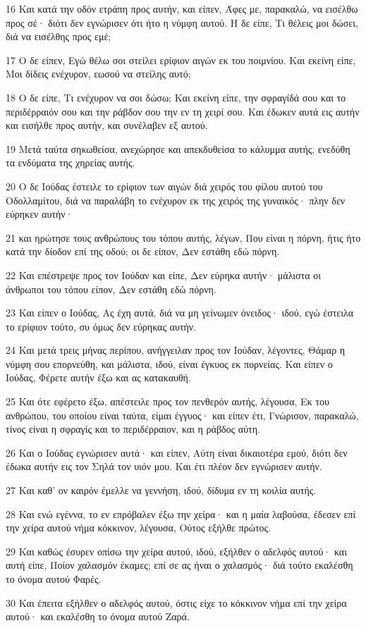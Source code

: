 \par 16 Και κατά την οδόν ετράπη προς αυτήν, και είπεν, Άφες με, παρακαλώ, να εισέλθω προς σέ· διότι δεν εγνώρισεν ότι ήτο η νύμφη αυτού. Η δε είπε, Τι θέλεις μοι δώσει, διά να εισέλθης προς εμέ;
\par 17 Ο δε είπεν, Εγώ θέλω σοι στείλει ερίφιον αιγών εκ του ποιμνίου. Και εκείνη είπε, Μοι δίδεις ενέχυρον, εωσού να στείλης αυτό;
\par 18 Ο δε είπε, Τι ενέχυρον να σοι δώσω; Και εκείνη είπε, την σφραγίδά σου και το περιδέρραιόν σου και την ράβδον σου την εν τη χειρί σου. Και έδωκεν αυτά εις αυτήν και εισήλθε προς αυτήν, και συνέλαβεν εξ αυτού.
\par 19 Μετά ταύτα σηκωθείσα, ανεχώρησε και απεκδυθείσα το κάλυμμα αυτής, ενεδύθη τα ενδύματα της χηρείας αυτής.
\par 20 Ο δε Ιούδας έστειλε το ερίφιον των αιγών διά χειρός του φίλου αυτού του Οδολλαμίτου, διά να παραλάβη το ενέχυρον εκ της χειρός της γυναικός· πλην δεν εύρηκεν αυτήν·
\par 21 και ηρώτησε τους ανθρώπους του τόπου αυτής, λέγων, Που είναι η πόρνη, ήτις ήτο κατά την δίοδον επί της οδού; οι δε είπον, Δεν εστάθη εδώ πόρνη.
\par 22 Και επέστρεψε προς τον Ιούδαν και είπε, Δεν εύρηκα αυτήν· μάλιστα οι άνθρωποι του τόπου είπον, Δεν εστάθη εδώ πόρνη.
\par 23 Και είπεν ο Ιούδας, Ας έχη αυτά, διά να μη γείνωμεν όνειδος· ιδού, εγώ έστειλα το ερίφιον τούτο, συ όμως δεν εύρηκας αυτήν.
\par 24 Και μετά τρεις μήνας περίπου, ανήγγειλαν προς τον Ιούδαν, λέγοντες, Θάμαρ η νύμφη σου επορνεύθη, και μάλιστα, ιδού, είναι έγκυος εκ πορνείας. Και είπεν ο Ιούδας, Φέρετε αυτήν έξω και ας κατακαυθή.
\par 25 Και ότε εφέρετο έξω, απέστειλε προς τον πενθερόν αυτής, λέγουσα, Εκ του ανθρώπου, του οποίου είναι ταύτα, είμαι έγγυος· και είπεν έτι, Γνώρισον, παρακαλώ, τίνος είναι η σφραγίς και το περιδέρραιον, και η ράβδος αύτη.
\par 26 Και ο Ιούδας εγνώρισεν αυτά· και είπεν, Αύτη είναι δικαιοτέρα εμού, διότι δεν έδωκα αυτήν εις τον Σηλά τον υιόν μου. Και έτι πλέον δεν εγνώρισεν αυτήν.
\par 27 Και καθ' ον καιρόν έμελλε να γεννήση, ιδού, δίδυμα εν τη κοιλία αυτής.
\par 28 Και ενώ εγέννα, το εν επρόβαλεν έξω την χείρα· και η μαία λαβούσα, έδεσεν επί την χείρα αυτού νήμα κόκκινον, λέγουσα, Ούτος εξήλθε πρώτος.
\par 29 Και καθώς έσυρεν οπίσω την χείρα αυτού, ιδού, εξήλθεν ο αδελφός αυτού· και αυτή είπε, Ποίον χαλασμόν έκαμες; επί σε ας ήναι ο χαλασμός· διά τούτο εκαλέσθη το όνομα αυτού Φαρές.
\par 30 Και έπειτα εξήλθεν ο αδελφός αυτού, όστις είχε το κόκκινον νήμα επί την χείρα αυτού· και εκαλέσθη το όνομα αυτού Ζαρά.

